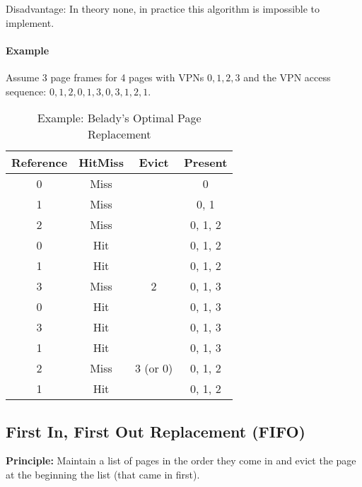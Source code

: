 			Disadvantage: In theory none, in practice this algorithm is impossible to implement.

			\paragraph{Example}
				Assume 3 page frames for 4 pages with VPNs \( 0, 1, 2, 3 \) and the VPN access sequence: \( 0, 1, 2, 0, 1, 3, 0, 3, 1, 2, 1 \).
				\begin{table}[H]
					\centering
					\begin{tabular}{c|c|c|c}
						\textbf{Reference} & \textbf{Hit}\textbf{Miss} & \textbf{Evict} & \textbf{Present} \\ \hline
						0                  & Miss                      &                & 0                \\
						1                  & Miss                      &                & 0, 1             \\
						2                  & Miss                      &                & 0, 1, 2          \\
						0                  & Hit                       &                & 0, 1, 2          \\
						1                  & Hit                       &                & 0, 1, 2          \\
						3                  & Miss                      & 2              & 0, 1, 3          \\
						0                  & Hit                       &                & 0, 1, 3          \\
						3                  & Hit                       &                & 0, 1, 3          \\
						1                  & Hit                       &                & 0, 1, 3          \\
						2                  & Miss                      & 3 (or 0)       & 0, 1, 2          \\
						1                  & Hit                       &                & 0, 1, 2
					\end{tabular}
					\caption{Example: Belady's Optimal Page Replacement}
				\end{table}

		\subsection{First In, First Out Replacement (FIFO)} %
			\textbf{Principle:} Maintain a list of pages in the order they come in and evict the page at the beginning the list (that came in first).

